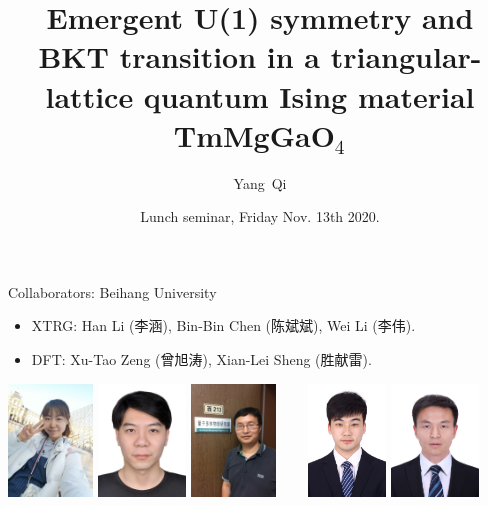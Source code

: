 \documentclass[xcolor=table, aspectratio=1610,ignorenonframetext]{beamer}
\title %
{Emergent U(1) symmetry and BKT transition in a triangular-lattice quantum Ising material TmMgGaO${}_4$}
\author[Y Qi] %
{Yang~Qi}
\institute[Fudan] %
{
Department of Physics, Fudan University.
}
\date{Lunch seminar, Friday Nov. 13th 2020.}
\begin{document}
\begin{frame}
  \titlepage
\end{frame}

\begin{frame}{Collaborators: Beihang University}
\begin{itemize}
	\item XTRG: Han Li (李涵), Bin-Bin Chen (陈斌斌), Wei Li (李伟).
	\item DFT: Xu-Tao Zeng (曾旭涛), Xian-Lei Sheng (胜献雷).
\end{itemize}
	\begin{center}
		\includegraphics[height=3cm]{../people/hanli}
		\includegraphics[height=3cm]{../people/binbinchen}
		\includegraphics[height=3cm]{../people/weili}~~~~
		\includegraphics[height=3cm]{../people/xutaozeng}
		\includegraphics[height=3cm]{../people/xianleisheng}
	\end{center}
\end{frame}
\end{document}

